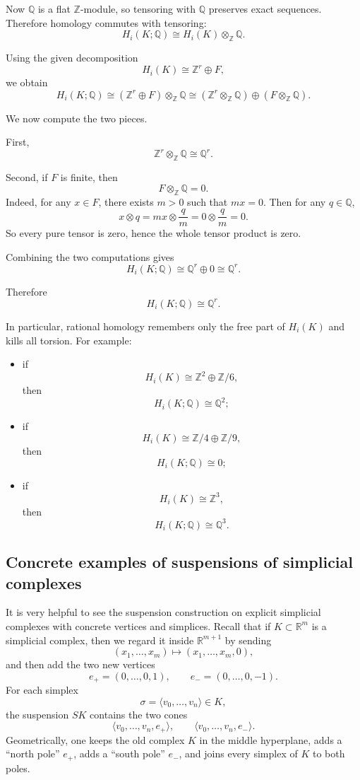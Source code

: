 \documentclass[12pt,a4paper]{article}
\theoremstyle{notespace}
\begin{document}
Now \(\mathbb Q\) is a flat \(\mathbb Z\)-module, so tensoring with \(\mathbb Q\) preserves exact sequences. Therefore homology commutes with tensoring:
\[
H_i(K;\mathbb Q)\cong H_i(K)\otimes_{\mathbb Z}\mathbb Q.
\]

Using the given decomposition
\[
H_i(K)\cong \mathbb Z^r\oplus F,
\]
we obtain
\[
H_i(K;\mathbb Q)\cong (\mathbb Z^r\oplus F)\otimes_{\mathbb Z}\mathbb Q
\cong (\mathbb Z^r\otimes_{\mathbb Z}\mathbb Q)\oplus (F\otimes_{\mathbb Z}\mathbb Q).
\]

We now compute the two pieces.

First,
\[
\mathbb Z^r\otimes_{\mathbb Z}\mathbb Q\cong \mathbb Q^r.
\]

Second, if \(F\) is finite, then
\[
F\otimes_{\mathbb Z}\mathbb Q=0.
\]
Indeed, for any \(x\in F\), there exists \(m>0\) such that \(mx=0\). Then for any \(q\in \mathbb Q\),
\[
x\otimes q = mx\otimes \frac{q}{m}=0\otimes \frac{q}{m}=0.
\]
So every pure tensor is zero, hence the whole tensor product is zero.

Combining the two computations gives
\[
H_i(K;\mathbb Q)\cong \mathbb Q^r\oplus 0\cong \mathbb Q^r.
\]

Therefore
\[
\boxed{H_i(K;\mathbb Q)\cong \mathbb Q^r.}
\]

\medskip

In particular, rational homology remembers only the free part of \(H_i(K)\) and kills all torsion. For example:

\begin{itemize}
	\item if
	\[
	H_i(K)\cong \mathbb Z^2\oplus \mathbb Z/6,
	\]
	then
	\[
	H_i(K;\mathbb Q)\cong \mathbb Q^2;
	\]
	\item if
	\[
	H_i(K)\cong \mathbb Z/4\oplus \mathbb Z/9,
	\]
	then
	\[
	H_i(K;\mathbb Q)\cong 0;
	\]
	\item if
	\[
	H_i(K)\cong \mathbb Z^3,
	\]
	then
	\[
	H_i(K;\mathbb Q)\cong \mathbb Q^3.
	\]
\end{itemize}

\subsection{Concrete examples of suspensions of simplicial complexes}

It is very helpful to see the suspension construction on explicit simplicial complexes with concrete vertices and simplices. Recall that if \(K\subset \mathbb R^m\) is a simplicial complex, then we regard it inside \(\mathbb R^{m+1}\) by sending
\[
(x_1,\dots,x_m)\longmapsto (x_1,\dots,x_m,0),
\]
and then add the two new vertices
\[
e_+=(0,\dots,0,1),
\qquad
e_-=(0,\dots,0,-1).
\]
For each simplex
\[
\sigma=\langle v_0,\dots,v_n\rangle\in K,
\]
the suspension \(SK\) contains the two cones
\[
\langle v_0,\dots,v_n,e_+\rangle,
\qquad
\langle v_0,\dots,v_n,e_-\rangle.
\]
Geometrically, one keeps the old complex \(K\) in the middle hyperplane, adds a ``north pole'' \(e_+\), adds a ``south pole'' \(e_-\), and joins every simplex of \(K\) to both poles.
\end{document}
